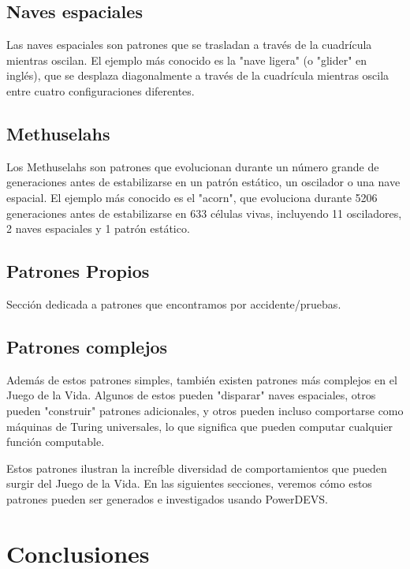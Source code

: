 \documentclass[]{article}
\begin{document}

\subsection{Naves espaciales}
Las naves espaciales son patrones que se trasladan a través de la cuadrícula mientras oscilan. El ejemplo más conocido es la "nave ligera" (o "glider" en inglés), que se desplaza diagonalmente a través de la cuadrícula mientras oscila entre cuatro configuraciones diferentes.

\subsection{Methuselahs}
Los Methuselahs son patrones que evolucionan durante un número grande de generaciones antes de estabilizarse en un patrón estático, un oscilador o una nave espacial. El ejemplo más conocido es el "acorn", que evoluciona durante 5206 generaciones antes de estabilizarse en 633 células vivas, incluyendo 11 osciladores, 2 naves espaciales y 1 patrón estático.


\subsection{Patrones Propios}
Sección dedicada a patrones que encontramos por accidente/pruebas.

\subsection{Patrones complejos}
Además de estos patrones simples, también existen patrones más complejos en el Juego de la Vida. Algunos de estos pueden "disparar" naves espaciales, otros pueden "construir" patrones adicionales, y otros pueden incluso comportarse como máquinas de Turing universales, lo que significa que pueden computar cualquier función computable.


Estos patrones ilustran la increíble diversidad de comportamientos que pueden surgir del Juego de la Vida. En las siguientes secciones, veremos cómo estos patrones pueden ser generados e investigados usando PowerDEVS.



\section{Conclusiones}
\end{document}
